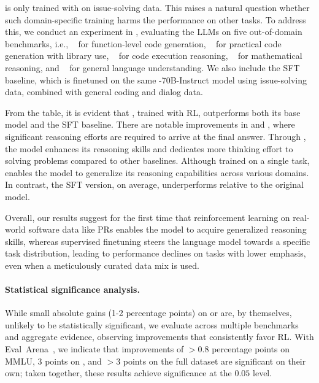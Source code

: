 \ours is only trained with \tech{} on issue-solving data.
This raises a natural question whether such domain-specific training harms the performance on other tasks.
To address this, we conduct an experiment in , evaluating the LLMs on five out-of-domain benchmarks, i.e.,
\humaneval{+}~\cite{codex,liu2023code} for function-level code generation,
\bigcodebench~\cite{bigcodebench} for practical code generation with library use,
\cruxeval~\cite{cruxeval} for code execution reasoning,
\mathbench~\cite{mathbench} for mathematical reasoning,
and \mmlu~\cite{mmlu} for general language understanding.
We also include the SFT baseline, which is finetuned on the same -70B-Instruct model using issue-solving data, combined with general coding and dialog data.

From the table, it is evident that \ours[70], trained with RL, outperforms both its base model and the SFT baseline.
There are notable improvements in \cruxeval and \mathbench, where significant reasoning efforts are required to arrive at the final answer. Through \tech, the model enhances its reasoning skills and dedicates more thinking effort to solving problems compared to other baselines.
Although trained on a single task, \tech{} enables the model to generalize its reasoning capabilities across various domains. In contrast, the SFT version, on average, underperforms relative to the original model.

Overall, our results suggest for the first time that reinforcement learning on real-world software data like PRs enables the model to acquire generalized reasoning skills, whereas supervised finetuning steers the language model towards a specific task distribution, leading to performance declines on tasks with lower emphasis, even when a meticulously curated data mix is used.

\paragraph{Statistical significance analysis.}
While small absolute gains (1-2 percentage points) on \humaneval or \cruxeval are, by themselves, unlikely to be statistically significant, we evaluate across multiple benchmarks and aggregate evidence, observing improvements that consistently favor RL. With Eval~Arena~\cite{evalarena}, we indicate that improvements of $>0.8$ percentage points on MMLU, 3 points on \cruxeval, and $>3$ points on the full \mathbench dataset are significant on their own; taken together, these results achieve significance at the $0.05$ level.


